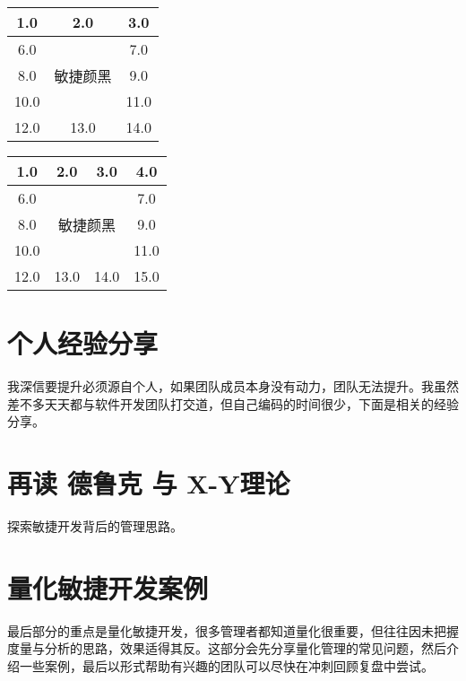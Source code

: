 \documentclass{book}        %
\begin{document}
\begin{tabular}{|c|c|c|}
\hline
1.0&2.0&3.0\\
\hline
6.0&\multirow{3}{*}{敏捷颜黑}&7.0\\
\cline{1-1}
\cline{3-3}
8.0&&9.0\\
\cline{1-1}
\cline{3-3}
10.0&&11.0\\
\hline
12.0&13.0&14.0\\
\hline
\end{tabular}

\begin{tabular}{|c|c|c|c|}
\hline
1.0&2.0&3.0&4.0\\
\hline
6.0&\multicolumn{2}{c|}{\multirow{3}{*}{敏捷颜黑}}&7.0\\
\cline{1-1}
\cline{4-4}
8.0&\multicolumn{2}{c|}{}&9.0\\
\cline{1-1}
\cline{4-4}
10.0&\multicolumn{2}{c|}{}&11.0\\
\hline
12.0&13.0&14.0&15.0\\
\hline
\end{tabular}

\part{个人经验分享}我深信要提升必须源自个人，如果团队成员本身没有动力，团队无法提升。我虽然差不多天天都与软件开发团队打交道，但自己编码的时间很少，下面是相关的经验分享。\\



\part{再读 德鲁克 与 X-Y理论}探索敏捷开发背后的管理思路。\\
 
 
\part{量化敏捷开发案例}最后部分的重点是量化敏捷开发，很多管理者都知道量化很重要，但往往因未把握度量与分析的思路，效果适得其反。这部分会先分享量化管理的常见问题，然后介绍一些案例，最后以形式帮助有兴趣的团队可以尽快在冲刺回顾复盘中尝试。\\



\appendix



%
\end{document}
